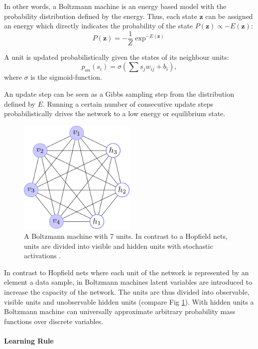In other words, a Boltzmann machine is an energy based model with the probability distribution defined by the energy.
Thus, each state $\textbf{z}$ can be assigned an energy which directly indicates the probability of the state $P(\textbf{z}) \propto -E(\textbf{z})$:
\[
P(\textbf{z}) = - \frac{1}{Z} \exp^{-E(\textbf{z})} 
\]

A unit is updated probabilistically given the states of its neighbour units:
\[
p_{on}(s_i) = \sigma( \sum s_j w_{ij} + b_i ), 
\]
where $\sigma$ is the sigmoid-function.

An update step can be seen as a Gibbs sampling step from the distribution defined by $E$.
Running a certain number of consecutive update steps probabilistically drives the network to a low energy or equilibrium state.


\begin{figure}
	\centering
    	\includegraphics[width=0.5\textwidth]{imgs/bm.png} 
    \caption[A Boltzmann machine with 7 units.]{A Boltzmann machine with 7 units. In contrast to a Hopfield nets, units are divided into visible and hidden units with stochastic activations \cite{boltzImg}.}
	\label{fig:bm}
\end{figure}

In contrast to Hopfield nets where each unit of the network is represented by an element a data sample, in Boltzmann machines latent variables are introduced to increase the capacity of the network.
The units are thus divided into observable, visible units and unobservable hidden units (compare Fig \ref{fig:bm}).
With hidden units a Boltzmann machine can universally approximate arbitrary probability mass functions over discrete variables.


\paragraph{Learning Rule} \label{c:cd}

